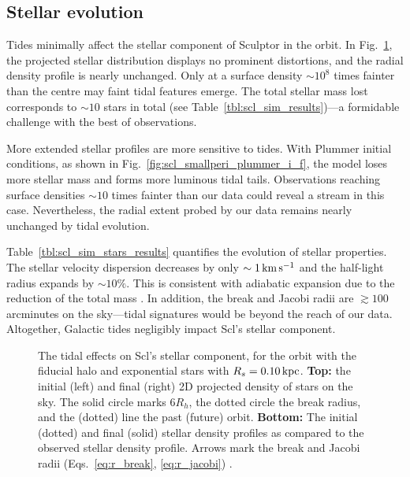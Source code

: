 \subsection{Stellar evolution}\label{stellar-evolution}

Tides minimally affect the stellar component of Sculptor in the
\smallperi{} orbit. In Fig.~\ref{fig:scl_smallperi_i_f}, the projected
stellar distribution displays no prominent distortions, and the radial
density profile is nearly unchanged. Only at a surface density
\(\sim10^8\) times fainter than the centre may faint tidal features
emerge. The total stellar mass lost corresponds to \(\sim 10\) stars in
total (see Table~\ref{tbl:scl_sim_results})---a formidable challenge
with the best of observations.

More extended stellar profiles are more sensitive to tides. With Plummer
initial conditions, as shown in
Fig.~\ref{fig:scl_smallperi_plummer_i_f}, the model loses more stellar
mass and forms more luminous tidal tails. Observations reaching surface
densities \(\sim10\) times fainter than our data could reveal a stream
in this case. Nevertheless, the radial extent probed by our data remains
nearly unchanged by tidal evolution.

Table~\ref{tbl:scl_sim_stars_results} quantifies the evolution of
stellar properties. The stellar velocity dispersion decreases by only
\(\sim1\,{\rm km\,s^{-1}}\) and the half-light radius expands by \(\sim 10\%\). This
is consistent with adiabatic expansion due to the reduction of the total
mass \citep[e.g.,][]{stucker+2023}. In addition, the break and Jacobi
radii are \(\gtrsim 100\) arcminutes on the sky---tidal signatures would
be beyond the reach of our data. Altogether, Galactic tides negligibly
impact Scl's stellar component.

\begin{figure}
\centering
{}
\caption[Sculptor initial and final density profiles]{The tidal effects
on Scl's stellar component, for the \smallperi{} orbit with the fiducial
halo and exponential stars with \(R_s=0.10\,{\rm kpc}\). \textbf{Top:} the
initial (left) and final (right) 2D projected density of stars on the
sky. The solid circle marks \(6R_h\), the dotted circle the break
radius, and the (dotted) line the past (future) orbit. \textbf{Bottom:}
The initial (dotted) and final (solid) stellar density profiles as
compared to the observed stellar density profile. Arrows mark the break
and Jacobi radii (Eqs.~\ref{eq:r_break}, \ref{eq:r_jacobi})
.}\label{fig:scl_smallperi_i_f}
\end{figure}

